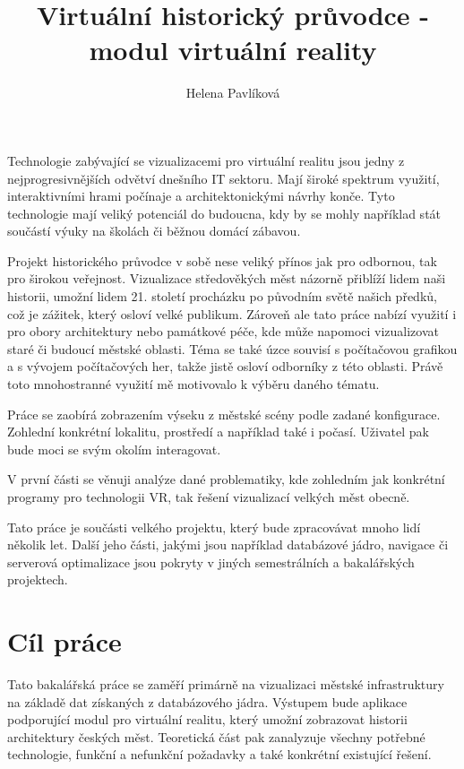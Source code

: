 \documentclass[thesis=B,czech]{FITthesis}[2012/06/26]
\title{Virtuální historický průvodce - modul virtuální reality}
\author{Helena Pavlíková} %
\begin{document}

\begin{introduction}
	Technologie zabývající se vizualizacemi pro virtuální realitu jsou jedny z nejprogresivnějších odvětví dnešního IT sektoru. Mají široké spektrum využití, interaktivními hrami počínaje a architektonickými návrhy konče. Tyto technologie mají veliký potenciál do budoucna, kdy by se mohly například stát součástí výuky na školách či běžnou domácí zábavou.

Projekt historického průvodce v sobě nese veliký přínos jak pro odbornou, tak pro širokou veřejnost. Vizualizace středověkých měst názorně přiblíží lidem naši historii, umožní lidem 21. století procházku po původním světě našich předků, což je zážitek, který osloví velké publikum. Zároveň ale tato práce nabízí využití i pro obory architektury nebo památkové péče, kde může napomoci vizualizovat staré či budoucí městské oblasti. Téma se také úzce souvisí s počítačovou grafikou a s vývojem počítačových her, takže jistě osloví  odborníky z této oblasti. Právě toto mnohostranné využití mě motivovalo k výběru daného tématu. 

Práce se zaobírá zobrazením výseku z městské scény podle zadané konfigurace. Zohlední konkrétní lokalitu, prostředí a například také i počasí. Uživatel pak bude moci se svým okolím interagovat.

V první části se věnuji analýze dané problematiky, kde zohledním jak konkrétní programy pro technologii VR, tak řešení vizualizací velkých měst obecně.

Tato práce je součásti velkého projektu, který bude zpracovávat mnoho lidí několik let. Další jeho části, jakými jsou například databázové jádro, navigace či serverová optimalizace jsou pokryty v jiných semestrálních a bakalářských projektech.

\end{introduction}

\chapter{Cíl práce}

Tato bakalářská práce se zaměří primárně na vizualizaci městské infrastruktury na základě dat získaných z databázového jádra. Výstupem bude aplikace podporující modul pro virtuální realitu, který umožní zobrazovat historii architektury českých měst. Teoretická část pak zanalyzuje všechny potřebné technologie, funkční a nefunkční požadavky a také konkrétní existující řešení.
\end{document}

